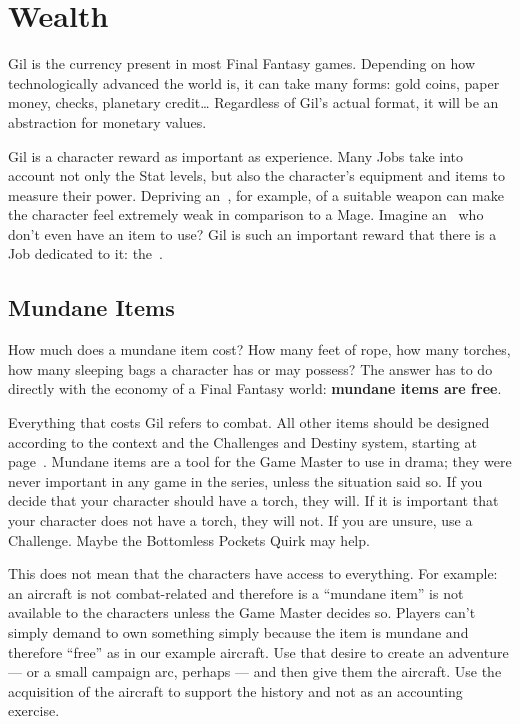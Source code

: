 \section{Wealth}

\begin{multicols}{2}\label{sec:inv-wealth}
Gil is the currency present in most Final Fantasy games. Depending on how technologically advanced the world is, it can take many forms: gold coins, paper money, checks, planetary credit\ldots{} Regardless of Gil’s actual format, it will be an abstraction for monetary values.

Gil is a character reward as important as experience. Many Jobs take into account not only the Stat levels, but also the character’s equipment and items to measure their power. Depriving an~, for example, of a suitable weapon can make the character feel extremely weak in comparison to a Mage. Imagine an~ who don’t even have an item to use? Gil is such an important reward that there is a Job dedicated to it: the~.

\subsection{Mundane Items}\label{subsec:inv-mundane}
How much does a mundane item cost? How many feet of rope, how many torches, how many sleeping bags a character has or may possess? The answer has to do directly with the economy of a Final Fantasy world: \textbf{mundane items are free}.

Everything that costs Gil refers to combat. All other items should be designed according to the context and the Challenges and Destiny system, starting at page~\pageref{sec:challenges}. Mundane items are a tool for the Game Master to use in drama; they were never important in any game in the series, unless the situation said so. If you decide that your character should have a torch, they will. If it is important that your character does not have a torch, they will not. If you are unsure, use a Challenge. Maybe the Bottomless Pockets Quirk may help.

This does not mean that the characters have access to everything. For example: an aircraft is not combat-related and therefore is a ``mundane item'' is not available to the characters unless the Game Master decides so. Players can’t simply demand to own something simply because the item is mundane and therefore ``free'' as in our example aircraft. Use that desire to create an adventure --- or a small campaign arc, perhaps --- and then give them the aircraft. Use the acquisition of the aircraft to support the history and not as an accounting exercise.


\end{multicols}
